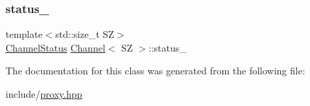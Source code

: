 \mbox{\label{classChannel_a62d282a44d5b5998c0b4fe8299ee1edd}} 
\subsubsection{\texorpdfstring{status\+\_\+}{status\_}}
{\footnotesize\ttfamily template$<$std\+::size\+\_\+t SZ$>$ \\
\hyperlink{proxy_8hpp_abdf990fbe51b4c9d3fdcc2fc3c6f9219}{Channel\+Status} \hyperlink{classChannel}{Channel}$<$ SZ $>$\+::status\+\_\+\hspace{0.3cm}{\ttfamily [private]}}



The documentation for this class was generated from the following file\+:\begin{DoxyCompactItemize}
\item 
include/\hyperlink{proxy_8hpp}{proxy.\+hpp}\end{DoxyCompactItemize}
